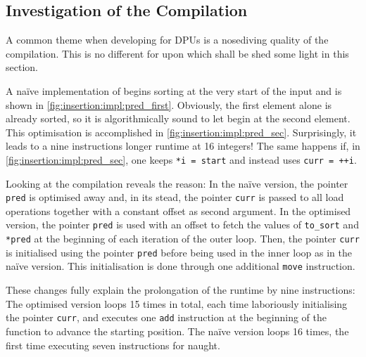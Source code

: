 \subsection*{Investigation of the Compilation}
\label{sec:tasklet:insertion:compilation}

A common theme when developing for DPUs is a nosediving quality of the compilation.
This is no different for \IS{} upon which shall be shed some light in this section.

A naïve implementation of \IS{} begins sorting at the very start of the input and is shown in \cref{fig:insertion:impl:pred_first}.
Obviously, the first element alone is already sorted, so it is algorithmically sound to let \IS{} begin at the second element.
This optimisation is accomplished in \cref{fig:insertion:impl:pred_sec}.
Surprisingly, it leads to a nine instructions longer runtime at 16 integers!
The same happens if, in \cref{fig:insertion:impl:pred_sec}, one keeps \lstinline|*i = start| and instead uses \lstinline|curr = ++i|.

Looking at the compilation reveals the reason:
In the naïve version, the pointer \lstinline|pred| is optimised away and, in its stead, the pointer \lstinline|curr| is passed to all load operations together with a constant offset as second argument.
In the optimised version, the pointer \lstinline|pred| is used with an offset to fetch the values of \lstinline|to_sort| and \lstinline|*pred| at the beginning of each iteration of the outer loop.
Then, the pointer \lstinline|curr| is initialised using the pointer \lstinline|pred| before being used in the inner loop as in the naïve version.
This initialisation is done through one additional \lstinline|move| instruction.

These changes fully explain the prolongation of the runtime by nine instructions:
The optimised version loops 15 times in total, each time laboriously initialising the pointer \lstinline|curr|, and executes one \lstinline|add| instruction at the beginning of the function to advance the starting position.
The naïve version loops 16 times, the first time executing seven instructions for naught.

